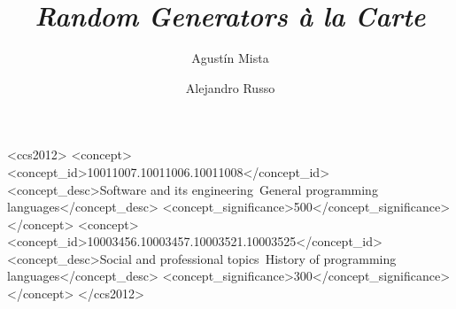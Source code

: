 \documentclass[sigplan,review,anonymous]{acmart}
\begin{document}
\title{\textit{Random Generators \`a la Carte}}



\author{Agust\'in Mista}

\author{Alejandro Russo}



\begin{abstract}
\end{abstract}


\begin{CCSXML}
<ccs2012>
<concept>
<concept_id>10011007.10011006.10011008</concept_id>
<concept_desc>Software and its engineering~General programming languages</concept_desc>
<concept_significance>500</concept_significance>
</concept>
<concept>
<concept_id>10003456.10003457.10003521.10003525</concept_id>
<concept_desc>Social and professional topics~History of programming languages</concept_desc>
<concept_significance>300</concept_significance>
</concept>
</ccs2012>
\end{CCSXML}


\end{document}
